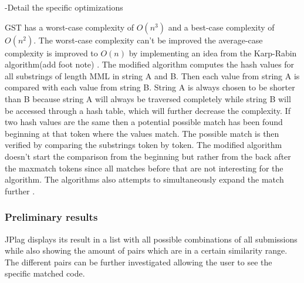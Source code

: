 \documentclass[a4paper, 11pt]{article}
\renewcommand{\\}{\vspace*{0.5\baselineskip} \newline}
\begin{document}
{\color{red} -Detail the specific optimizations}

GST has a worst-case complexity of \(O(n^3)\)\autocite[p. 5]{GST} and a best-case complexity of \(O(n^2)\)\autocite[p. 14]{JPlagP}. The worst-case
complexity can't be improved the average-case complexity is improved to \(O(n)\) by implementing an idea from the Karp-Rabin algorithm(add foot note)
\autocite*[p. 14]{JPlagP}. The modified algorithm computes the hash values for all substrings of length MML in string A and B. Then each value from
string A is compared with each value from string B. String A is always chosen to be shorter than B because string A will always be traversed completely
while string B will be accessed through a hash table, which will further decrease the complexity. If two hash values are the same then a potential possible match has
been found beginning at that token where the values match. The possible match is then verified by comparing the substrings token by token. 
The modified algorithm doesn't start the comparison from the beginning but rather from the back after the maxmatch tokens since all matches before that
are not interesting for the algorithm. The algorithms also attempts to simultaneously expand the match further \autocite[p. 14]{JPlagP}.

\subsubsection{Preliminary results}

JPlag displays its result in a list with all possible combinations of all submissions while also showing the amount of pairs which are in a certain
similarity range. The different pairs can be further investigated allowing the user to see the specific matched code.
\end{document}
